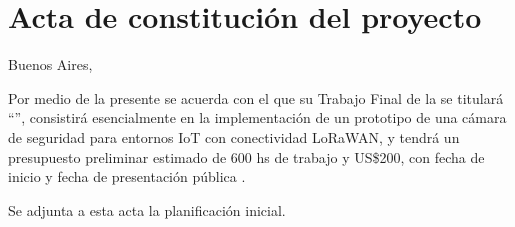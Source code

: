 \documentclass[
11pt, %
]{plan}
\begin{document}
\pagebreak



\section*{Acta de constitución del proyecto}
\label{sec:acta}

\begin{flushright}
Buenos Aires, \fechaInicioName
\end{flushright}

\vspace{2cm}

Por medio de la presente se acuerda con el \authorname\hspace{1px} que su Trabajo Final de la \degreename\hspace{1px} se titulará ``\ttitle'', consistirá esencialmente en la implementación de un prototipo de una cámara de seguridad para entornos IoT con conectividad LoRaWAN, y tendrá un presupuesto preliminar estimado de 600 hs de trabajo y US\$200, con fecha de inicio \fechaInicioName\hspace{1px} y fecha de presentación pública \fechaFinalName.

Se adjunta a esta acta la planificación inicial.

\vfill
\end{document}
